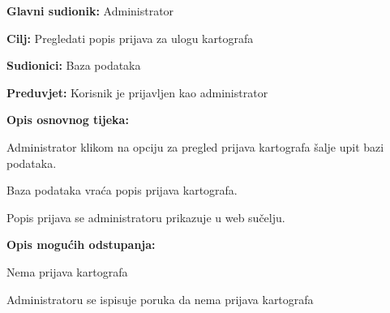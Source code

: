 				\noindent {}
				\begin{packed_item}
					
					\item \textbf{Glavni sudionik: }Administrator
					\item  \textbf{Cilj:} Pregledati popis prijava za ulogu kartografa
					\item  \textbf{Sudionici:} Baza podataka
					\item  \textbf{Preduvjet:} Korisnik je prijavljen kao administrator
					\item  \textbf{Opis osnovnog tijeka:}
					
					\item[] \begin{packed_enum}
						
						\item Administrator klikom na opciju za pregled prijava kartografa šalje upit bazi podataka.
						\item Baza podataka vraća popis prijava kartografa.
						\item Popis prijava se administratoru prikazuje u web sučelju.
					\end{packed_enum}
					
					\item  \textbf{Opis mogućih odstupanja:}
					
					\item[] \begin{packed_item}
						
						\item[2.a] Nema prijava kartografa
						\item[] \begin{packed_enum}
							
							\item Administratoru se ispisuje poruka da nema prijava kartografa


					

						\end{packed_enum}
						
					\end{packed_item}
				\end{packed_item}
				
